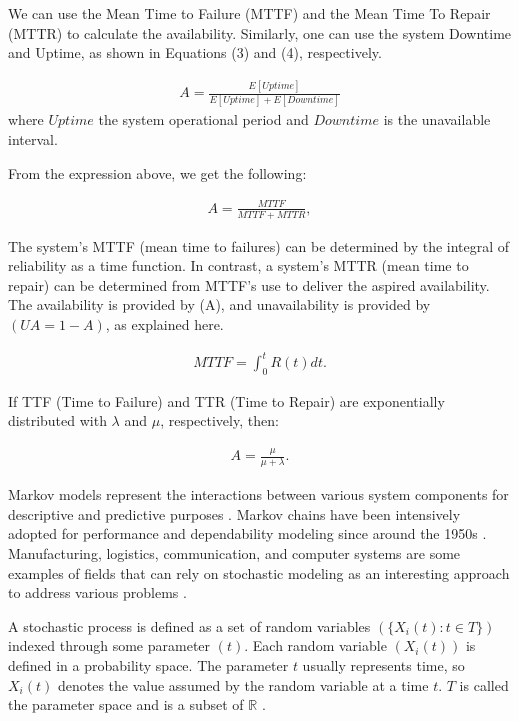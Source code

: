 \documentclass[conference]{IEEEtran}
\begin{document}
We can use the Mean Time to Failure (MTTF) and the Mean Time To Repair (MTTR) to calculate the availability. Similarly, one can use the system Downtime and Uptime, as shown in Equations (3) and (4), respectively.

\begin{align}
A = \frac{E[Uptime]}{E[Uptime] + E[Downtime]}
\end{align}
%
where $Uptime$ the system operational period and $Downtime$ is the unavailable interval. 

From the expression above, we get the following:

\begin{align}
A = \frac{MTTF}{MTTF + MTTR},
\end{align}

The system's MTTF (mean time to failures) can be determined by the integral of reliability as a time function. In contrast, a system's MTTR (mean time to repair) can be determined from MTTF's use to deliver the aspired availability. The availability is provided by (A), and unavailability is provided by $(UA= 1-A)$, as explained here.

\begin{align}
MTTF = \int_{0}^{t} R(t)dt.
\end{align}

If TTF (Time to Failure) and TTR (Time to Repair) are exponentially distributed with $\lambda$ and $\mu$, respectively, then:

\begin{align}
A = \frac{\mu}{\mu + \lambda}.
\end{align}

Markov models represent the interactions between various system components for descriptive and predictive purposes \citep{daniel2004performance}. Markov chains have been intensively adopted for performance and dependability modeling since around the 1950s \citep{maciel2012dependability}. Manufacturing, logistics, communication, and computer systems are some examples of fields that can rely on stochastic modeling as an interesting approach to address various problems \citep{maciel2021survey}.

A stochastic process is defined as a set of random variables $(\{ X_{i}(t):t \in T \})$ indexed through some parameter $(t)$. Each random variable $(X_i(t))$ is defined in a probability space. The parameter $t$ usually represents time, so $X_{i}(t)$ denotes the value assumed by the random variable at a time $t$. $T$  is called the parameter space and is a subset of $\mathbb{R}$ \citep{maciel2021survey}.
\end{document}
